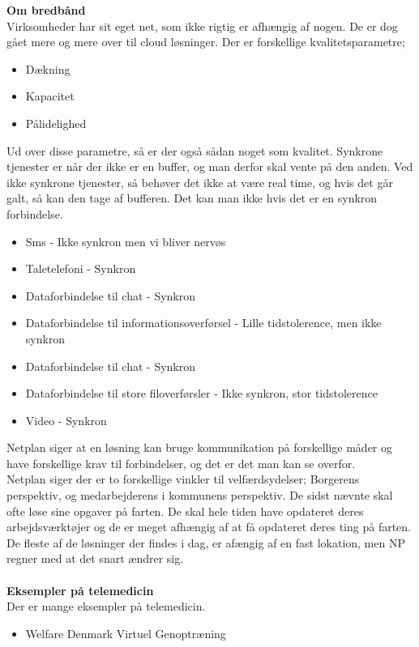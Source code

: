 \textbf{Om bredbånd}\\
Virksomheder har sit eget net, som ikke rigtig er afhængig af nogen. De er dog gået mere og mere over til cloud løsninger. 
Der er forskellige kvalitetsparametre; 
\begin{itemize}
\item Dækning
\item Kapacitet
\item Pålidelighed
\end{itemize}
Ud over disse parametre, så er der også sådan noget som kvalitet. Synkrone tjenester er når der ikke er en buffer, og man derfor skal vente på den anden. Ved ikke synkrone tjenester, så behøver det ikke at være real time, og hvis det går galt, så kan den tage af bufferen. Det kan man ikke hvis det er en synkron forbindelse. \\
\begin{itemize}
\item Sms - Ikke synkron men vi bliver nervøs
\item Taletelefoni - Synkron
\item Dataforbindelse til chat - Synkron
\item Dataforbindelse til informationsoverførsel - Lille tidstolerence, men ikke synkron
\item Dataforbindelse til chat - Synkron
\item Dataforbindelse til store filoverførsler - Ikke synkron, stor tidstolerence
\item Video - Synkron
\end{itemize}
Netplan siger at en løsning kan bruge kommunikation på forskellige måder og have forskellige krav til forbindelser, og det er det man kan se overfor.\\
Netplan siger der er to forskellige vinkler til velfærdsydelser; Borgerens perspektiv, og medarbejderens i kommunens perspektiv. De sidst nævnte skal ofte løse sine opgaver på farten. De skal hele tiden have opdateret deres arbejdsværktøjer og de er meget afhængig af at få opdateret deres ting på farten. De fleste af de løsninger der findes i dag, er afængig af en fast lokation, men NP regner med at det snart ændrer sig.\\ \\ 
\textbf{Eksempler på telemedicin}\\
Der er mange eksempler på telemedicin.\\
\begin{itemize}
\item Welfare Denmark Virtuel Genoptræning
\end{itemize}
